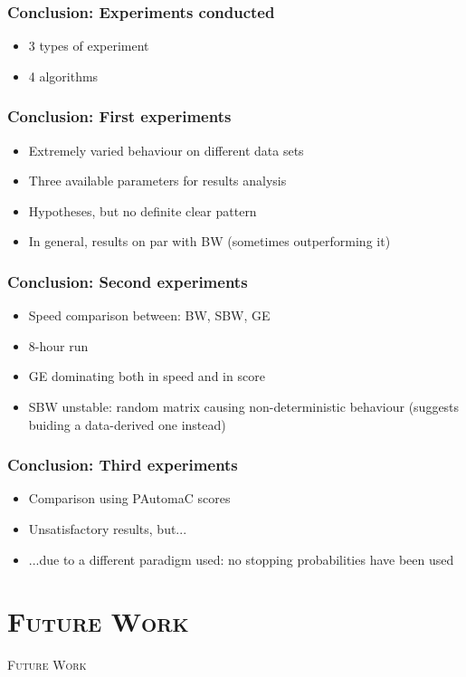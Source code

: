 \begin{frame}
  \frametitle{Conclusion: Experiments conducted}
  \begin{itemize}
  	\item 3 types of experiment
  	\item 4 algorithms
  \end{itemize}
\end{frame}

\begin{frame}
  \frametitle{Conclusion: First experiments}
  \begin{itemize}
  	\item Extremely varied behaviour on different data sets
  	\item Three available parameters for results analysis
  	\item Hypotheses, but no definite clear pattern
  	\item In general, results on par with BW (sometimes outperforming it)
  \end{itemize}
\end{frame}

\begin{frame}
  \frametitle{Conclusion: Second experiments}
  \begin{itemize}
  	\item Speed comparison between: BW, SBW, GE
  	\item 8-hour run
  	\item GE dominating both in speed and in score
  	\item SBW unstable: random matrix causing non-deterministic behaviour (suggests buiding a data-derived one instead)
  \end{itemize}
\end{frame}

\begin{frame}
  \frametitle{Conclusion: Third experiments}
  \begin{itemize}
  	\item Comparison using PAutomaC scores
  	\item Unsatisfactory results, but...
  	\item ...due to a different paradigm used: no stopping probabilities have been used
  \end{itemize}
\end{frame}


\section{\scshape Future Work}
\begin{frame}
\center \huge \scshape Future Work
\end{frame}

